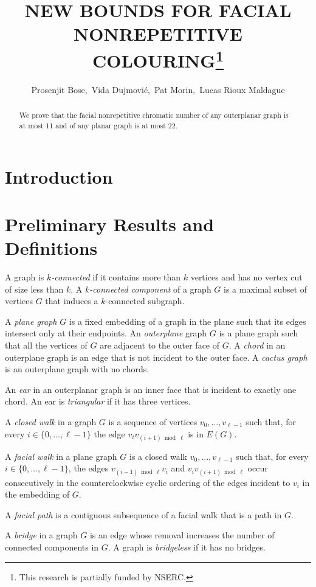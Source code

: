 \documentclass{patmorin}
\title{\MakeUppercase{New Bounds for Facial Nonrepetitive Colouring}\thanks{This research is partially funded by NSERC.}}
\author{Prosenjit Bose,\, Vida Dujmovi\'c,\, Pat Morin,\, Lucas Rioux Maldague}
\begin{document}
\maketitle


\begin{abstract}
  We prove that the facial nonrepetitive chromatic number of any outerplanar graph is at most 11 and of any planar graph is at most 22.
\end{abstract}


\section{Introduction}

\section{Preliminary Results and Definitions}

A graph is \emph{$k$-connected} if it contains more than $k$ vertices and has
no vertex cut of size less than $k$.  A \emph{$k$-connected component} of a graph $G$ is a maximal subset of vertices $G$ that induces a $k$-connected subgraph.

A \emph{plane graph} $G$ is a fixed embedding of a graph in the plane such
that its edges intersect only at their endpoints. An \emph{outerplane}
graph $G$ is a plane graph such that all the vertices of $G$ are adjacent
to the outer face of $G$. A \emph{chord} in an outerplane graph is
an edge that is not incident to the outer face. A \emph{cactus graph}
is an outerplane graph with no chords.

An \emph{ear} in an outerplanar graph is an inner face that is incident to
exactly one chord. An ear is \emph{triangular} if it has three vertices.

A \emph{closed walk} in a graph $G$ is a sequence of vertices
$v_0,\ldots,v_{\ell-1}$ such that, for every $i\in\{0,\ldots,\ell-1\}$
the edge $v_iv_{(i+1)\bmod \ell}$ is in $E(G)$.

A \emph{facial walk} in a plane graph $G$ is a closed walk
$v_0,\ldots,v_{\ell-1}$ such that, for every $i\in\{0,\ldots,\ell-1\}$,
the edges $v_{(i-1)\bmod \ell} v_i$ and $v_iv_{(i+1)\bmod\ell}$ occur
consecutively in the counterclockwise cyclic ordering of the edges
incident to $v_i$ in the embedding of $G$.

A \emph{facial path} is a contiguous subsequence of a facial walk that
is a path in $G$.

A \emph{bridge} in a graph $G$ is an edge whose removal increases the number of connected components in $G$.  A graph is \emph{bridgeless} if it has no bridges.
\end{document}
